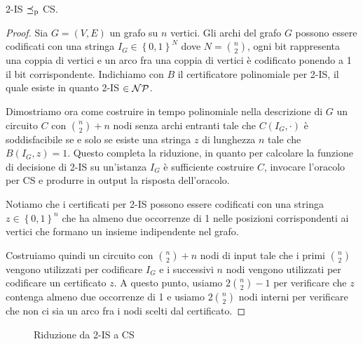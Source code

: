 \begin{theorem}
    2-IS $\preceq_\text{p}$ CS.
\end{theorem}
\begin{proof}
    Sia $G = (V,E)$ un grafo su $n$ vertici. Gli archi del grafo $G$ possono essere codificati con una stringa $I_G \in \left\{0,1\right\}^N$ dove $N = \binom{n}{2}$, ogni bit rappresenta una coppia di vertici e un arco fra una coppia di vertici è codificato ponendo a 1 il bit corrispondente. Indichiamo con $B$ il certificatore polinomiale per 2-IS, il quale esiste in quanto 2-IS $\in \mathcal{NP}$.

    Dimostriamo ora come costruire in tempo polinomiale nella descrizione di $G$ un circuito $C$ con $\binom{n}{2} + n$ nodi senza archi entranti tale che $C (I_G, \cdot)$ è soddisfacibile se e solo se esiste una stringa $z$ di lunghezza $n$ tale che $B(I_G, z) = 1$. Questo completa la riduzione, in quanto per calcolare la funzione di decisione di 2-IS su un'istanza $I_G$ è sufficiente costruire $C$, invocare l'oracolo per CS e produrre in output la risposta dell'oracolo.

    Notiamo che i certificati per 2-IS possono essere codificati con una stringa $z \in \left\{0,1\right\}^n$ che ha almeno due occorrenze di 1 nelle posizioni corrispondenti ai vertici che formano un insieme indipendente nel grafo.

    Costruiamo quindi un circuito con $\binom{n}{2} +n$ nodi di input tale che i primi $\binom{n}{2}$ vengono utilizzati per codificare $I_G$ e i successivi $n$ nodi vengono utilizzati per codificare un certificato $z$. A questo punto, usiamo $2 \binom{n}{2} - 1$ per verificare che $z$ contenga almeno due occorrenze di 1 e usiamo $2\binom{n}{2}$ nodi interni per verificare che non ci sia un arco fra i nodi scelti dal certificato.
\end{proof}


\begin{figure}[t]
    \centering
    \begin{minipage}{0.24\linewidth}
        \resizebox{\linewidth}{!}{}
    \end{minipage}
    \hfill
    \begin{minipage}{0.74\linewidth}
        \resizebox{\linewidth}{!}{}
    \end{minipage}
    \caption{Riduzione da 2-IS a CS}
    \label{fig:IStree}
\end{figure}

